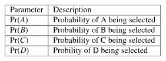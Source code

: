
\begin{align}
\begin{tabular}{|l|l|}\hline
Parameter	&Description	\\\hline
$\Pr(A)$	&Probability of A being selected	\\\hline
$\Pr(B)$	&Probability of B being selected	\\\hline
$\Pr(C)$	&Probability of C being selected	\\\hline
$\Pr(D)$        &Probility of D being selected		\\\hline
\end{tabular}
\end{align}
